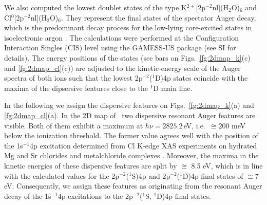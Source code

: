 {\color{blue} We also computed the lowest doublet states of the type K$^{2+}$[2p$^{-2}$nl](H$_2$O)$_6$ and Cl$^{0}$[2p$^{-2}$nl](H$_2$O)$_6$. They represent the final states of the spectator Auger decay, which is the predominant decay process for the low-lying core-excited states in isoelectronic argon \citep{ceolin15:022502}. The calculations were performed at the Configuration Interaction Singles (CIS) level using the GAMESS-US package \citep{GUGA_PhysScr_21,GUGA_JCP_70,GUS} (see SI for details).} The energy positions of the states (see bars on Figs.\ \ref{fg:2dmap_k}(c) and \ref{fg:2dmap_cl}(c)) are adjusted to the kinetic-energy scale of the Auger spectra of both ions such that the lowest 2p$^{-2}$($^1$D)4p states coincide with the maxima of the dipsersive features close to the $^1$D main line. 



{\color{blue} In the following we assign the dispersive features on Figs.\ \ref{fg:2dmap_k}(a) and \ref{fg:2dmap_cl}(a). In the 2D map of \cli~two dispersive resonant Auger features are visible.} Both of them exhibit a maximum at $h\nu =  2825.2$\,eV, {\color{blue} i.e.\ $\cong 200$ meV below the ionization threshold. The former value agrees well with the position of the  1s$^{-1}$4p excitation determined from Cl K-edge XAS experiments on hydrated Mg and Sr chlorides \citep{sugiura82:681} and metalchloride complexes \citep{shadle95:2259}. Moreover, the maxima in the kinetic energies of these dispersive features are split by $\cong$ 8.5 eV, which is in line with the calculated values for the 2p$^{-2}$($^1$S)4p and 2p$^{-2}$($^1$D)4p final states of $\cong 7$ eV. Consequently, we assign these features as originating from the resonant Auger decay of the 1s$^{-1}$4p excitations to the 2p$^{-2}$($^1$S, $^1$D)4p final states.} 



